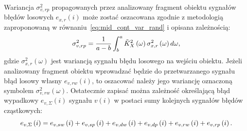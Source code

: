 Wariancja $\sigma_{v,rp}^{2}$ propagowanych przez analizowany fragment obiektu sygnałów błędów losowych $e_{x,r}(i)$ może zostać oszacowana zgodnie z metodologią zaproponowaną w równaniu~\eqref{eq:mid_cont_var_rand} i opisana zależnością:
\begin{equation}
\sigma_{v,rp}^{2} = \frac{1}{a - b} \int _{b} ^{a} \tilde{K}_{X}^{2} \left(\omega\right) \sigma_{x,r}^{2} \left(\omega\right) d\omega \label{eq:mid_disc_var_rand},
\end{equation}
gdzie $\sigma_{x,r}^{2}(\omega)$ jest wariancją sygnału błędu losowego na wejściu obiektu. Jeżeli analizowany fragment obiektu wprowadzać będzie do przetwarzanego sygnału błąd losowy własny $e_{v,rw}(i)$, to oszacować należy jego wariancję oznaczoną symbolem $\sigma_{v,rw}^{2}(\omega)$. Ostatecznie zapisać można zależność określającą błąd wypadkowy $e_{v,\Sigma}(i)$ sygnału $v(i)$ w postaci sumy kolejnych sygnałów błędów cząstkowych:
\begin{equation}
e_{v,\Sigma} \left(i\right) = e_{v,sw} \left(i\right) + e_{v,sp} \left(i\right) + e_{v,dw} \left(i\right) + e_{v,dp} \left(i\right) + e_{v,rw} \left(i\right) + e_{v,rp} \left(i\right) \label{eq:mid_disc_err_sum_all}.
\end{equation}

